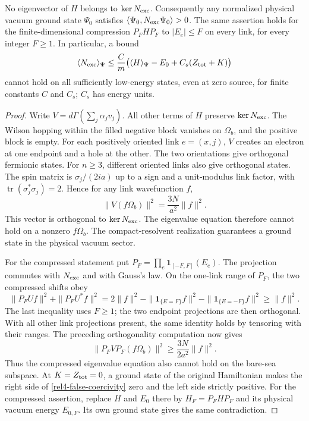 \begin{proposition}
\label{rel4-bare-sea}
No eigenvector of $H$ belongs to $\ker N_{\rm exc}$. Consequently any
normalized physical vacuum ground state $\Psi_0$ satisfies
$\langle\Psi_0,N_{\rm exc}\Psi_0\rangle>0$.
The same assertion holds for the finite-dimensional compression
$P_FHP_F$ to $|E_e|\le F$ on every link, for every integer $F\ge1$.
In particular, a bound
\begin{equation}
 \langle N_{\rm exc}\rangle_\Psi
 \le \frac{C}{m}\bigl(\langle H\rangle_\Psi-E_0+C_s(Z_{\rm tot}+K)\bigr)
 \label{rel4-false-coercivity}
\end{equation}
cannot hold on all sufficiently low-energy states, even at zero
source, for finite constants $C$ and $C_s$; $C_s$ has energy units.
\end{proposition}
\begin{proof}
Write $V=d\Gamma(\sum_j\alpha_jv_j)$. All other terms of $H$
preserve $\ker N_{\rm exc}$. The Wilson hopping within the filled
negative block vanishes on $\Omega_b$, and the positive block is empty.
For each positively oriented link $e=(x,j)$, $V$ creates an electron
at one endpoint and a hole at the other. The two orientations give
orthogonal fermionic states. For $n\ge3$, different oriented links
also give orthogonal states. The spin matrix is $\sigma_j/(2ia)$
up to a sign and a unit-modulus link factor, with
$\operatorname{tr}(\sigma_j^*\sigma_j)=2$. Hence for any link
wavefunction $f$,
\begin{equation}
 \|V(f\Omega_b)\|^2=\frac{3N}{a^2}\|f\|^2 .
 \label{rel4-sea-pair-norm}
\end{equation}
This vector is orthogonal to $\ker N_{\rm exc}$. The eigenvalue
equation therefore cannot hold on a nonzero $f\Omega_b$.
The compact-resolvent realization guarantees a ground state in the
physical vacuum sector.

For the compressed statement put $P_F=\prod_e\mathbf1_{[-F,F]}(E_e)$.
The projection commutes with $N_{\rm exc}$ and with Gauss's law.
On the one-link range of $P_F$, the two compressed shifts obey
\[
 \|P_FUf\|^2+\|P_FU^*f\|^2
 =2\|f\|^2-\|\mathbf1_{\{E=F\}}f\|^2
              -\|\mathbf1_{\{E=-F\}}f\|^2
 \ge\|f\|^2 .
\]
The last inequality uses $F\ge1$; the two endpoint projections are
then orthogonal. With all other link projections present, the same
identity holds by tensoring with their ranges. The preceding
orthogonality computation now gives
\[
 \|P_FVP_F(f\Omega_b)\|^2\ge\frac{3N}{2a^2}\|f\|^2 .
\]
Thus the compressed eigenvalue equation also cannot hold on the
bare-sea subspace. At $K=Z_{\rm tot}=0$, a ground state of the
original Hamiltonian makes the right side of
\eqref{rel4-false-coercivity} zero and the left side strictly positive.
For the compressed assertion, replace $H$ and $E_0$ there by
$H_F=P_FHP_F$ and its physical vacuum energy $E_{0,F}$.
Its own ground state gives the same contradiction.
\end{proof}

